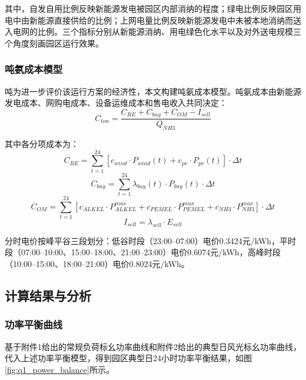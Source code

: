 其中，自发自用比例反映新能源发电被园区内部消纳的程度；绿电比例反映园区用电中由新能源直接供给的比例；上网电量比例反映新能源发电中未被本地消纳而送入电网的比例。三个指标分别从新能源消纳、用电绿色化水平以及对外送电规模三个角度刻画园区运行效果。

\subsubsection{吨氨成本模型}

吨为进一步评价该运行方案的经济性，本文构建吨氨成本模型。吨氨成本由新能源发电成本、网购电成本、设备运维成本和售电收入共同决定：
\begin{equation}\label{eq:C_ton}
C_{ton} = \frac{C_{RE} + C_{buy} + C_{OM} - I_{sell}}{Q_{NH3}}
\end{equation}

其中各分项成本为：
\begin{equation}
C_{RE} = \sum_{t=1}^{24} [c_{wind} \cdot P_{wind}(t) + c_{pv} \cdot P_{pv}(t)] \cdot \Delta t
\end{equation}
\begin{equation}
C_{buy} = \sum_{t=1}^{24} \lambda_{buy}(t) \cdot P_{buy}(t) \cdot \Delta t
\end{equation}
\begin{equation}
C_{OM} = \sum_{t=1}^{24} [c_{ALKEL} \cdot P_{ALKEL}^{max} + c_{PEMEL} \cdot P_{PEMEL}^{max} + c_{NH3} \cdot P_{NH3}^{max}] \cdot \Delta t
\end{equation}
\begin{equation}
I_{sell} = \lambda_{sell} \cdot E_{sell}
\end{equation}

分时电价按峰平谷三段划分：低谷时段（23:00--07:00）电价0.3424元/kWh，平时段（07:00--10:00、15:00--18:00、21:00--23:00）电价0.6074元/kWh，高峰时段（10:00--15:00、18:00--21:00）电价0.8024元/kWh。

\subsection{计算结果与分析}

\subsubsection{功率平衡曲线}

基于附件1给出的常规负荷标幺功率曲线和附件2给出的典型日风光标幺功率曲线，代入上述功率平衡模型，得到园区典型日24小时功率平衡结果，如图\ref{fig:q1_power_balance}所示。


